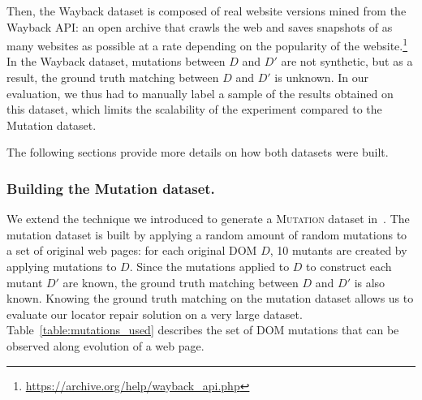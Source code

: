 \documentclass[preprint, 12pt]{elsarticle}
\begin{document}
Then, the {\sc Wayback} dataset is composed of real website versions mined from the Wayback API: an open archive that crawls the web and saves snapshots of as many websites as possible at a rate depending on the popularity of the website.\footnote{\url{https://archive.org/help/wayback_api.php}}
In the {\sc Wayback} dataset, mutations between $D$ and $D'$ are not synthetic, but as a result, the ground truth matching between $D$ and $D'$ is unknown.
In our evaluation, we thus had to manually label a sample of the results obtained on this dataset, which limits the scalability of the experiment compared to the {\sc Mutation} dataset. 

The following sections provide more details on how both datasets were built.

\subsubsection{Building the {\sc Mutation} dataset.}\label{mutationDataset}
We extend the technique we introduced to generate a \textsc{Mutation} dataset in~\cite{brisset2020sftm}.
The mutation dataset is built by applying a random amount of random mutations to a set of original web pages: for each original DOM $D$, 10 mutants are created by applying mutations to $D$.
Since the mutations applied to $D$ to construct each mutant $D'$ are known, the ground truth matching between $D$ and $D'$ is also known.
Knowing the ground truth matching on the mutation dataset allows us to evaluate our locator repair solution on a very large dataset. 
% 
Table~\ref{table:mutations_used} describes the set of DOM mutations that can be observed along evolution of a web page.

\begin{table}
    \caption{Mutations applied in the \textsc{Mutation} dataset~\cite{brisset2020sftm}.}
    \label{table:mutations_used}
    \centering
\end{table}
\end{document}
